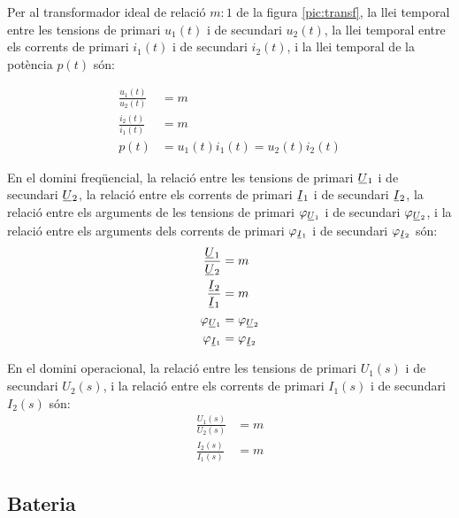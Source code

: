 Per al transformador
ideal de relació $m\!:\!1$ de la figura \vref{pic:transf}, la llei temporal
entre les tensions de primari $u_1(t)$ i de secundari $u_2(t)$, la
llei temporal entre els corrents de primari $i_1(t)$ i de secundari
$i_2(t)$, i la llei temporal de la potència $p(t)$ són:

\hfill
\begin{minipage}[b]{6.5cm}
	
	\label{pic:transf}
\end{minipage}
\hfill
\begin{minipage}[b][3.8cm][t]{10cm}
	\begin{align}
		\frac{u_1(t)}{u_2(t)} &= m  \\
		\frac{i_2(t)}{i_1(t)} &= m \\
		p(t) &= u_1(t) i_1(t) = u_2(t) i_2(t)
	\end{align}
\end{minipage}


 En el domini
freqüencial, la relació entre les tensions de primari $\cmplx{U}_1$
i de secundari $\cmplx{U}_2$, la relació entre els corrents de
primari $\cmplx{I}_1$ i de secundari $\cmplx{I}_2$, la relació entre
els arguments de les tensions de primari $\varphi_{\cmplx{U}_1}$ i
de secundari $\varphi_{\cmplx{U}_2}$, i  la relació entre els
arguments dels corrents de primari $\varphi_{\cmplx{I}_1}$ i de
secundari $\varphi_{\cmplx{I}_2}$ són:
\begin{align}
	\frac{\cmplx{U}_1}{\cmplx{U}_2} &= m  \\
	\frac{\cmplx{I}_2}{\cmplx{I}_1} &= m \\
	\varphi_{\cmplx{U}_1} &= \varphi_{\cmplx{U}_2} \\
	\varphi_{\cmplx{I}_1} &= \varphi_{\cmplx{I}_2}
\end{align}

 En el domini operacional, la relació entre les tensions de primari $U_1(s)$ i de secundari $U_2(s)$,  i la relació entre els corrents de primari $I_1(s)$ i de secundari $I_2(s)$ són:
\begin{align}
	\frac{U_1(s)}{U_2(s)} &= m  \\
	\frac{I_2(s)}{I_1(s)} &= m
\end{align}

\subsection{Bateria} 

